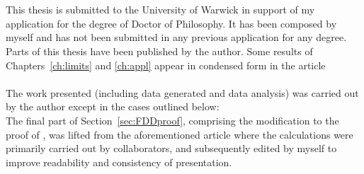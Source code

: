 \documentclass[oneside]{scrbook} %
\theoremstyle{definition}
\newcommand{\1}[1]{\mathbbm{1}_{#1}} %
\begin{document}




%
\chapter*{} %

This thesis is submitted to the University of Warwick in support of my application for the degree of Doctor of Philosophy. It has been composed by myself and has not been submitted in any previous application for any degree.
\\[5pt]
Parts of this thesis have been published by the author.
Some results of Chapters~\ref{ch:limits} and \ref{ch:appl} appear in condensed form in the article
\\
\\[5pt]
The work presented (including data generated and data analysis) was carried out by the author except in the cases outlined below:
\\
The final part of Section~\ref{sec:FDDproof}, comprising the modification to the proof of \textcite{koskela2018}, was lifted from the aforementioned article \parencite{brown2021} where the calculations were primarily carried out by collaborators, and subsequently edited by myself to improve readability and consistency of presentation.
\end{document}
